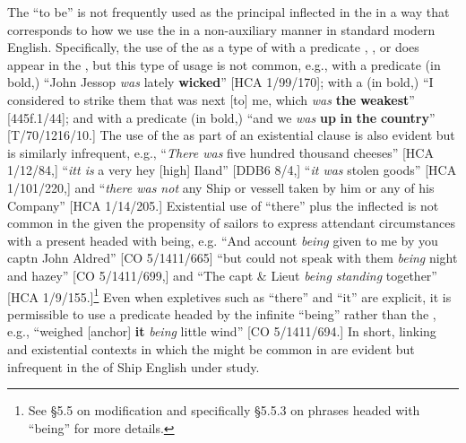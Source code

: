 The  “to be” is not frequently used as the principal inflected  in the  in a way that corresponds to how we use the  in a non-auxiliary manner in standard modern English. Specifically, the use of the  as a type of  with a predicate , , or  does appear in the , but this type of usage is not common, e.g., with a predicate  (in bold,) “John Jessop \textit{was} lately \textbf{wicked}” [HCA 1/99/170]; with a  (in bold,) “I considered to strike them that was next [to] me, which \textit{was} \textbf{the} \textbf{weakest}” [445f.1/44]; and with a predicate  (in bold,) “and we \textit{was} \textbf{up} \textbf{in} \textbf{the} \textbf{country}” [T/70/1216/10.] The use of the  as part of an existential clause is also evident but is similarly infrequent, e.g., “\textit{There was} five hundred thousand cheeses” [HCA 1/12/84,] “\textit{itt is} a very hey [high] Iland” [DDB6 8/4,] “\textit{it was} stolen goods” [HCA 1/101/220,] and “\textit{there was not} any Ship or vessell taken by him or any of his Company” [HCA 1/14/205.] Existential use of “there” plus the inflected  is not common in the  given the propensity of sailors to express attendant circumstances with a present  headed with being, e.g. “And account \textit{being} given to me by you captn John Aldred” [CO 5/1411/665] “but could not speak with them \textit{being} night and hazey” [CO 5/1411/699,] and “The capt \& Lieut \textit{being standing} together” [HCA 1/9/155.]\footnote{See §5.5 on  modification and specifically §5.5.3 on phrases headed with “being” for more details.} Even when expletives such as “there” and “it” are explicit, it is permissible to use a predicate headed by the infinite  “being” rather than the , e.g., “weighed [anchor] \textbf{it} \textit{being} little wind” [CO 5/1411/694.] In short, linking and existential contexts in which the  might be common in  are evident but infrequent in the  of Ship English under study. 

